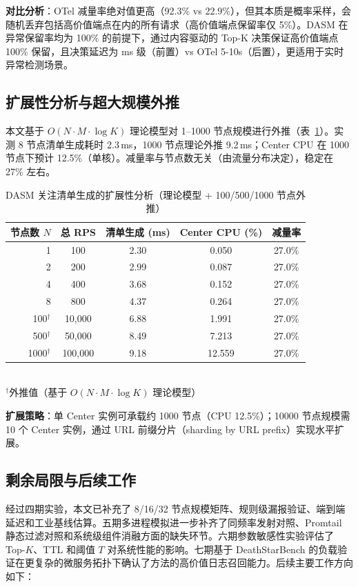 \textbf{对比分析}：OTel 减量率绝对值更高（92.3\% vs 22.9\%），但其本质是概率采样，会随机丢弃包括高价值端点在内的所有请求（高价值端点保留率仅 5\%）。DASM 在异常保留率均为 100\% 的前提下，通过内容驱动的 Top-K 决策保证高价值端点 100\% 保留，且决策延迟为 ms 级（前置）vs OTel 5-10s（后置），更适用于实时异常检测场景。

\subsection{扩展性分析与超大规模外推}
\label{sec:scale}

本文基于 $O(N \cdot M \cdot \log K)$ 理论模型对 1--1000 节点规模进行外推（表~\ref{tab:scale}）。实测 8 节点清单生成耗时 2.3\,ms，1000 节点理论外推 9.2\,ms；Center CPU 在 1000 节点下预计 12.5\%（单核）。减量率与节点数无关（由流量分布决定），稳定在 27\% 左右。

\begin{table}[H]
  \centering\small
  \caption{DASM 关注清单生成的扩展性分析（理论模型 + 100/500/1000 节点外推）}\label{tab:scale}
  \begin{tabular}{rcccc}
    \toprule
    节点数 $N$ & 总 RPS & 清单生成 (ms) & Center CPU (\%) & 减量率 \\
    \midrule
    1   & 100     & 2.30 & 0.050 & 27.0\% \\
    2   & 200     & 2.99 & 0.087 & 27.0\% \\
    4   & 400     & 3.68 & 0.152 & 27.0\% \\
    8   & 800     & 4.37 & 0.264 & 27.0\% \\
    100$^{\dagger}$  & 10,000  & 6.88 & 1.991  & 27.0\% \\
    500$^{\dagger}$  & 50,000  & 8.49 & 7.213  & 27.0\% \\
    1000$^{\dagger}$ & 100,000 & 9.18 & 12.559 & 27.0\% \\
    \bottomrule
  \end{tabular}
\\
\footnotesize $^{\dagger}$外推值（基于 $O(N \cdot M \cdot \log K)$ 理论模型）
\end{table}

\textbf{扩展策略}：单 Center 实例可承载约 1000 节点（CPU 12.5\%）；10000 节点规模需 10 个 Center 实例，通过 URL 前缀分片（sharding by URL prefix）实现水平扩展。

\subsection{剩余局限与后续工作}\label{sec:future}
经过四期实验，本文已补充了 8/16/32 节点规模矩阵、规则级漏报验证、端到端延迟和工业基线估算。五期多进程模拟进一步补齐了同频率发射对照、Promtail 静态过滤对照和系统级组件消融方面的缺失环节。六期参数敏感性实验评估了 Top-$K$、TTL 和阈值 $T$ 对系统性能的影响。七期基于 DeathStarBench 的负载验证在更复杂的微服务拓扑下确认了方法的高价值日志召回能力。后续主要工作方向如下：

